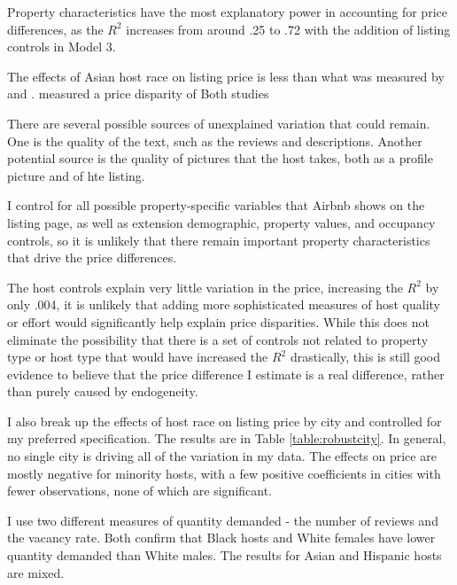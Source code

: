 Property characteristics have the most explanatory power in accounting for price differences, as the $R^2$ increases from around .25 to .72 with the addition of listing controls in Model 3. 

The effects of Asian host race on listing price is less than what was measured by \cite{wang} and \cite{kakar}. \cite{wang} measured a price disparity of  Both studies 





There are several possible sources of unexplained variation that could remain. One is the quality of the text, such as the reviews and descriptions. Another potential source is the quality of pictures that the host takes, both as a profile picture and of hte listing. 

I control for all possible property-specific variables that Airbnb shows on the listing page, as well as extension demographic, property values, and occupancy controls, so it is unlikely that there remain important property characteristics that drive the price differences. 

The host controls explain very little variation in the price, increasing the $R^2$ by only .004, it is unlikely that adding more sophisticated measures of host quality or effort would significantly help explain price disparities. While this does not eliminate the possibility that there is a set of controls not related to property type or host type that would have increased the $R^2$ drastically, this is still good evidence to believe that the price difference I estimate is a real difference, rather than purely caused by endogeneity. 









I also break up the effects of host race on listing price by city and controlled for my preferred specification. The results are in Table \ref{table:robustcity}. In general, no single city is driving all of the variation in my data. The effects on price are mostly negative for minority hosts, with a few positive coefficients in cities with fewer observations, none of which are significant. 

I use two different measures of quantity demanded - the number of reviews and the vacancy rate. Both confirm that Black hosts and White females have lower quantity demanded than White males. The results for Asian and Hispanic hosts are mixed. 

